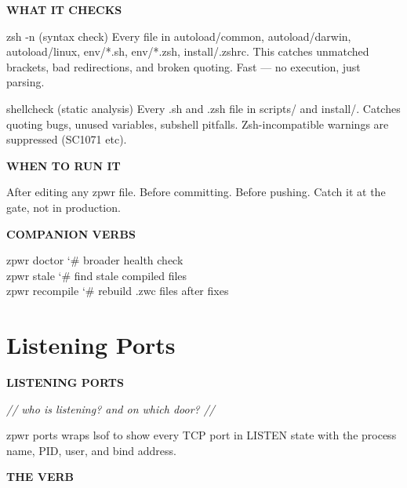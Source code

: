 \documentclass[11pt,a4paper,twoside]{book}
\begin{document}
\vspace{12pt}
{\bfseries\color{neonyellow} WHAT IT CHECKS}\vspace{4pt}

zsh -n (syntax check) Every file in autoload/common, autoload/darwin, autoload/linux, env/*.sh, env/*.zsh, install/.zshrc. This catches unmatched brackets, bad redirections, and broken quoting. Fast — no execution, just parsing.

shellcheck (static analysis) Every .sh and .zsh file in scripts/ and install/. Catches quoting bugs, unused variables, subshell pitfalls. Zsh-incompatible warnings are suppressed (SC1071 etc).


\vspace{12pt}
{\bfseries\color{neonyellow} WHEN TO RUN IT}\vspace{4pt}

After editing any zpwr file. Before committing. Before pushing. Catch it at the gate, not in production.


\vspace{12pt}
{\bfseries\color{neonyellow} COMPANION VERBS}\vspace{4pt}

\begin{codebox}
\color{neongreen}zpwr doctor               {\char`\#} broader health check\\
\color{neongreen}zpwr stale                {\char`\#} find stale compiled files\\
\color{neongreen}zpwr recompile            {\char`\#} rebuild .zwc files after fixes\\
\end{codebox}


\vspace{16pt}

\section{Listening Ports}


\vspace{10pt}
{\large\bfseries\color{neoncyan} LISTENING PORTS}\vspace{6pt}

{\small\itshape\color{dimtext} // who is listening? and on which door? //}

zpwr ports wraps lsof to show every TCP port in LISTEN state with the process name, PID, user, and bind address.


\vspace{12pt}
{\bfseries\color{neonyellow} THE VERB}\vspace{4pt}
\end{document}
